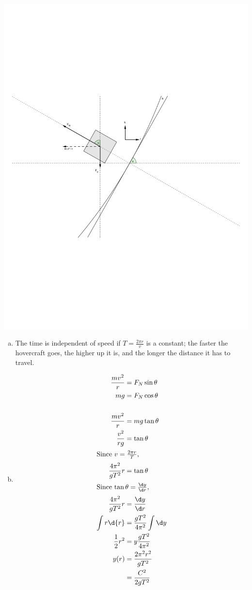 \documentclass{esg8012pset}
\begin{document}
\begin{solution}
  \begin{center}\includegraphics[width=.5\textwidth]{2009-10-02_Diagram_7_2}\end{center}
  \begin{enumerate}[a)]
    \item The time is independent of speed if $T = \frac{2\pi r}{v}$ is a constant; the faster the hovercraft goes, the higher up it is, and the longer the distance it has to travel.
    \item \begin{align*}
      \frac{mv^2}{r} & = F_N\sin\theta \\
      m g & = F_N\cos\theta \\
      \\
      \frac{mv^2}{r} & = m g \tan\theta \\
      \frac{v^2}{r g} & = \tan\theta \\
      \intertext{Since $v = \frac{2\pi r}{T}$,}
      \frac{4\pi^2}{g T^2}r & = \tan\theta \\
      \intertext{Since $\tan\theta = \frac{\d y}{\d r}$,}
      \frac{4\pi^2}{g T^2}r & = \frac{\d y}{\d r} \\
      \int r \d{r} & = \frac{g T^2}{4\pi^2} \int \d y \\
      \frac{1}{2}r^2 & = y\frac{g T^2}{4\pi^2} \\
      y(r) & = \frac{2 \pi^2 r^2}{g T^2} \\
       & = \frac{C^2}{2g T^2}
    \end{align*}
  \end{enumerate}
\end{solution}
\end{document}
